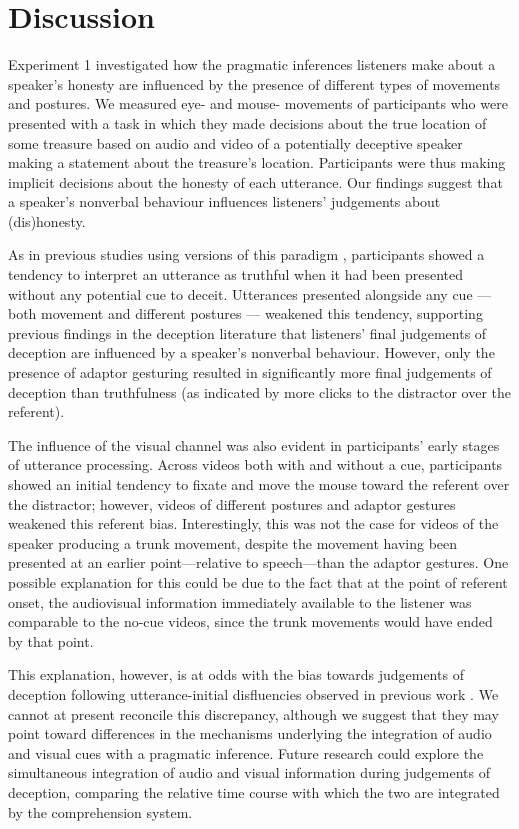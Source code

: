 \documentclass[a4paper,man,natbib]{apa6}
\begin{document}
\section{Discussion}
Experiment 1 investigated how the pragmatic inferences listeners make about a speaker's honesty are influenced by the presence of different types of movements and postures. 
We measured eye- and mouse- movements of participants who were presented with a task in which they made decisions about the true location of some treasure based on audio and video of a potentially deceptive speaker making a statement about the treasure's location.
Participants were thus making implicit decisions about the honesty of each utterance.
Our findings suggest that a speaker's nonverbal behaviour influences listeners' judgements about (dis)honesty.

As in previous studies using versions of this paradigm \citep{Loy2017, King2018}, participants showed a tendency to interpret an utterance as truthful when it had been presented without any potential cue to deceit.
Utterances presented alongside any cue --- both movement and different postures --- weakened this tendency, supporting previous findings in the deception literature that listeners' final judgements of deception are influenced by a speaker's nonverbal behaviour.
However, only the presence of adaptor gesturing resulted in significantly more final judgements of deception than truthfulness (as indicated by more clicks to the distractor over the referent).

The influence of the visual channel was also evident in participants' early stages of utterance processing. 
Across videos both with and without a cue, participants showed an initial tendency to fixate and move the mouse toward the referent over the distractor; however, videos of different postures and adaptor gestures weakened this referent bias.
Interestingly, this was not the case for videos of the speaker producing a trunk movement, despite the movement having been presented at an earlier point---relative to speech---than the adaptor gestures.
One possible explanation for this could be due to the fact that at the point of referent onset, the audiovisual information immediately available to the listener was comparable to the no-cue videos, since the trunk movements would have ended by that point.

This explanation, however, is at odds with the bias towards judgements of deception following utterance-initial disfluencies observed in previous work \citetext{\citet{Loy2017}, Experiment 1}.
We cannot at present reconcile this discrepancy, although we suggest that they may point toward differences in the mechanisms underlying the integration of audio and visual cues with a pragmatic inference.
Future research could explore the simultaneous integration of audio and visual information during judgements of deception, comparing the relative time course with which the two are integrated by the comprehension system.
\end{document}
